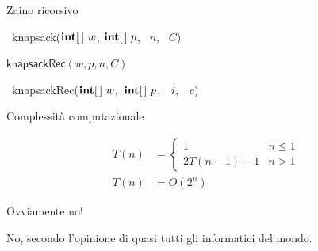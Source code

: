 \begin{frame}{Zaino ricorsivo}

\vspace{-9pt}
\begin{Procedure}
\caption[A]{\INTEGER\ \textsf{knapsack}($\INTEGER[\,]\ w$, $\INTEGER[\,]\ p$, \INTEGER\ $n$, \INTEGER\ $C$)}
\Return $\textsf{knapsackRec}(w, p, n, C)$
\end{Procedure}

\vspace{-15pt}
\begin{Procedure}
\caption[A]{\INTEGER\ \textsf{knapsackRec}($\INTARRAY\ w$,\ $\INTARRAY\ p$,\  \INTEGER\ $i$,\ \INTEGER\ $c$)}

\end{Procedure}


\end{frame}


\begin{frame}[fragile]{Complessità computazionale}

\vspace{-9pt}

\begin{align*}
T(n) &= \begin{cases}
  1 & n \leq 1 \\
  2T(n-1)+1 & n>1
\end{cases}\\
  T(n) &= O(2^n)
\end{align*}


\smallskip
Ovviamente no!

\medskip
{}

\smallskip
No, secondo l'\alert{opinione} di quasi tutti gli informatici del mondo.

\end{frame}


